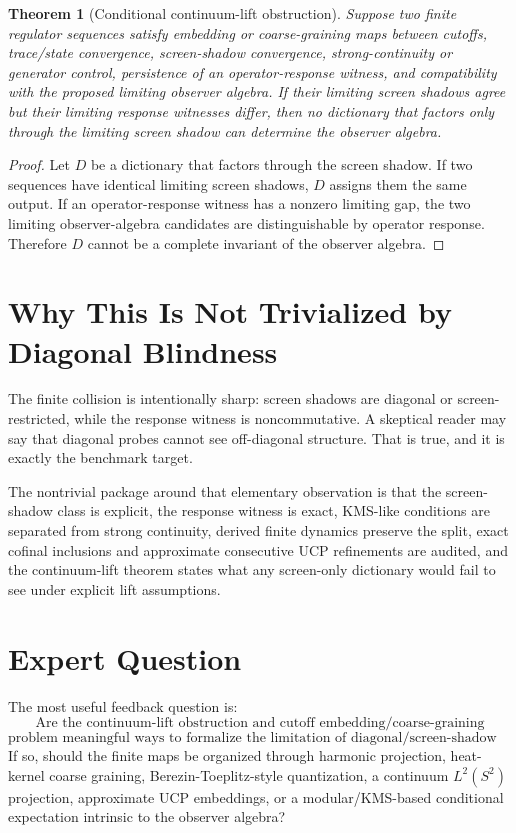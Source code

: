 \documentclass[11pt]{article}
\newtheorem{theorem}{Theorem}
\begin{document}
\begin{theorem}[Conditional continuum-lift obstruction]
Suppose two finite regulator sequences satisfy embedding or coarse-graining
maps between cutoffs, trace/state convergence, screen-shadow convergence,
strong-continuity or generator control, persistence of an operator-response
witness, and compatibility with the proposed limiting observer algebra. If
their limiting screen shadows agree but their limiting response witnesses
differ, then no dictionary that factors only through the limiting screen
shadow can determine the observer algebra.
\end{theorem}

\begin{proof}
Let $D$ be a dictionary that factors through the screen shadow. If two
sequences have identical limiting screen shadows, $D$ assigns them the same
output. If an operator-response witness has a nonzero limiting gap, the two
limiting observer-algebra candidates are distinguishable by operator response.
Therefore $D$ cannot be a complete invariant of the observer algebra.
\end{proof}

\section{Why This Is Not Trivialized by Diagonal Blindness}

The finite collision is intentionally sharp: screen shadows are diagonal or
screen-restricted, while the response witness is noncommutative. A skeptical
reader may say that diagonal probes cannot see off-diagonal structure. That is
true, and it is exactly the benchmark target.

The nontrivial package around that elementary observation is that the
screen-shadow class is explicit, the response witness is exact, KMS-like
conditions are separated from strong continuity, derived finite dynamics
preserve the split, exact cofinal inclusions and approximate consecutive UCP
refinements are audited, and the continuum-lift theorem states what any
screen-only dictionary would fail to see under explicit lift assumptions.

\section{Expert Question}

The most useful feedback question is:
\[
\text{Are the continuum-lift obstruction and cutoff embedding/coarse-graining}
\]
\[
\text{problem meaningful ways to formalize the limitation of diagonal/screen-shadow data?}
\]
If so, should the finite maps be organized through harmonic projection,
heat-kernel coarse graining, Berezin-Toeplitz-style quantization, a continuum
$L^2(S^2)$ projection, approximate UCP embeddings, or a modular/KMS-based
conditional expectation intrinsic to the observer algebra?
\end{document}
